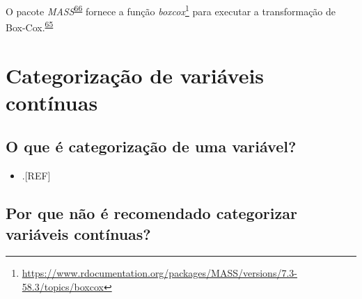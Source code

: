 \documentclass[
  a4paper,
]{book}
\providecommand{\tightlist}{%
  \setlength{\itemsep}{0pt}\setlength{\parskip}{0pt}}
\renewcommand{\href}[2]{#2\footnote{\url{#1}}}
\newenvironment{infobox}[1]
  {
  \begin{itemize}
  \renewcommand{\labelitemi}{
    \raisebox{-.7\height}[0pt][0pt]{
      {\setkeys{Gin}{width=3em,keepaspectratio}
        \texttt{[image: \#1]}}
    }
  }
  \setlength{\fboxsep}{1em}
  \begin{blackbox}
  \item
  }
  {
  \end{blackbox}
  \end{itemize}
  }
\begin{document}
\begin{infobox}{images/Rlogo}
O pacote \emph{MASS}\textsuperscript{\protect\hyperlink{ref-MASS}{66}} fornece a função \href{https://www.rdocumentation.org/packages/MASS/versions/7.3-58.3/topics/boxcox}{\emph{boxcox}} para executar a transformação de Box-Cox.\textsuperscript{\protect\hyperlink{ref-box1964}{65}}

\end{infobox}

\hypertarget{categorizacao}{%
\section{Categorização de variáveis contínuas}\label{categorizacao}}

\hypertarget{o-que-uxe9-categorizauxe7uxe3o-de-uma-variuxe1vel}{%
\subsection{O que é categorização de uma variável?}\label{o-que-uxe9-categorizauxe7uxe3o-de-uma-variuxe1vel}}

\begin{itemize}
\tightlist
\item
  .{[}REF{]}
\end{itemize}

\hypertarget{por-que-nuxe3o-uxe9-recomendado-categorizar-variuxe1veis-contuxednuas}{%
\subsection{Por que não é recomendado categorizar variáveis contínuas?}\label{por-que-nuxe3o-uxe9-recomendado-categorizar-variuxe1veis-contuxednuas}}
\end{document}
